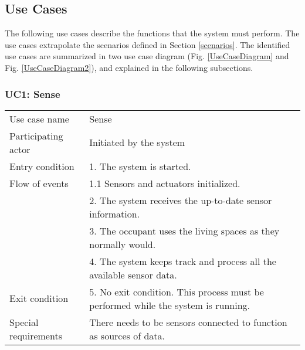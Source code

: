
\subsection{Use Cases}
\label{sec:useCases}
The following use cases describe the functions that the system must perform. The use cases extrapolate the scenarios defined in Section \ref{scenarios}. The identified use cases are summarized in two use case diagram (Fig. \ref{UseCaseDiagram} and Fig. \ref{UseCaseDiagram2}), and explained in the following subsections.




\subsubsection{UC1: Sense}
\label{sec:sense}

\begin{tabular}{ l p{11cm} }
	\hline                       
	Use case name & Sense\\
	Participating actor & Initiated by the system\\
	Entry condition & 1. The system is started. \\
	Flow of events & 1.1 Sensors and actuators initialized.\\
	& 2. The system receives the up-to-date sensor information.\\
	& 3. The occupant uses the living spaces as they normally would. \\
	& 4. The system keeps track and process all the available sensor data. \\	
	Exit condition & 5. No exit condition. This process must be performed while the system is running. \\
	Special requirements & There needs to be sensors connected  to function as sources of data. \\
	\hline
\end{tabular}

